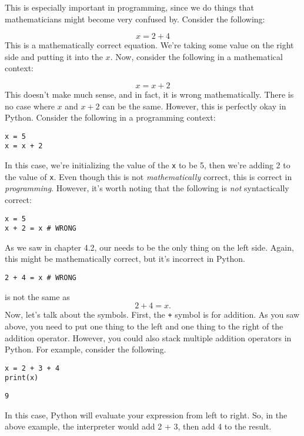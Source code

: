 This is especially important in programming, since we do things that mathematicians might become very confused by. Consider the following:\par
$$
x = 2 + 4
$$
This is a mathematically correct equation. We're taking some value on the right side and putting it into the  $x$. Now, consider the following in a mathematical context:\par
$$
x = x + 2
$$
This doesn't make much sense, and in fact, it is wrong mathematically. There is no case where $x$ and $x + 2$ can be the same. However, this is perfectly okay in Python. Consider the following in a programming context:\par
\begin{lstlisting}[style=pippython]
x = 5
x = x + 2
\end{lstlisting}
In this case, we're initializing the value of the  \verb|x| to be 5, then we're adding 2 to the value of \verb|x|. Even though this is not \textit{mathematically} correct, this is correct in \textit{programming}. However, it's worth noting that the following is \textit{not} syntactically correct:\par
\begin{lstlisting}[style=pippython]
x = 5 
x + 2 = x # WRONG
\end{lstlisting}
As we saw in chapter 4.2, our  needs to be the only thing on the left side. Again, this might be mathematically correct, but it's incorrect in Python.\par
\begin{lstlisting}[style=pippython]
2 + 4 = x # WRONG
\end{lstlisting}
is not the same as 
$$
2 + 4 = x.
$$
Now, let's talk about the  symbols. First, the \verb|+| symbol is for addition. As you saw above, you need to put one thing to the left and one thing to the right of the addition operator. However, you could also stack multiple addition operators in Python. For example, consider the following.\par
\begin{lstlisting}[style=pippython]
x = 2 + 3 + 4
print(x)
\end{lstlisting}
\begin{lstlisting}[style=none]
9
\end{lstlisting}
In this case, Python will evaluate your expression from left to right. So, in the above example, the interpreter would add 2 + 3, then add 4 to the result.\par
